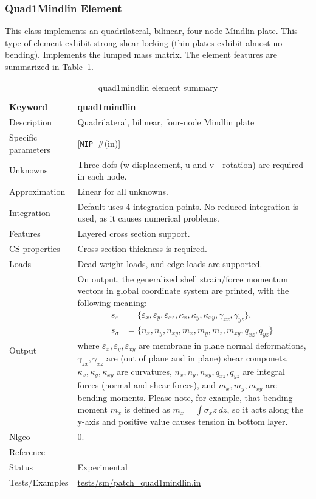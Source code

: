 \documentclass[a4paper]{article}
\newcommand{\param}[1]{\texttt{#1}} %
\newcommand{\optional}[1]{[#1]} %
\newcommand{\field}[2]{\param{#1}~\#{\tiny(#2)}} %
\newcommand{\optField}[2]{\optional{\field{#1}{#2}}}
\newcommand{\templabel}{}%
\newcommand{\tempcaption}{}%
\newcounter{nelpar}
\newenvironment{elementsummary}[5]{%
  \gdef\tempcaption{#4}%
  \gdef\templabel{#5}%
  \setcounter{nelpar}{0}%
  \begin{center} %
    \begin{table}[!htb] %
      \begin{tabular}{|l|p{9cm}|}\hline %
        {\bf Keyword} & \bf{#1}\\ %
        {Description} & {#2}\\ %
        {Specific parameters} & {#3}\\ \hline %
}{
  \\ \hline %
      \end{tabular}%
      \caption{\tempcaption}%
      \label{\templabel}%
    \end{table}%
  \end{center}%
}
\newcommand{\elementParam}[1]{%
  \ifthenelse{\value{nelpar}>0} %
             {&{#1}}%
             {\setcounter{nelpar}{1}Parameters&{#1}}%
             \\%
}
\newcommand{\elementDescription}[2]{{#1} & {#2}\\}
\begin{document}
\subsubsection{Quad1Mindlin Element} \label{quad1mindlin}
This class implements an quadrilateral, bilinear, four-node Mindlin plate.
This type of element exhibit strong shear locking (thin plates exhibit almost no bending).
Implements the lumped mass matrix. The element features are summarized in Table~\ref{quad1mindlinsummary}.

\begin{elementsummary}{quad1mindlin}{Quadrilateral, bilinear, four-node Mindlin plate}{\optField{NIP}{in}}{quad1mindlin element summary}{quad1mindlinsummary}
\elementDescription{Unknowns}{Three dofs (w-displacement, u and v - rotation) are required in each node.}
\elementDescription{Approximation}{Linear for all unknowns.}
\elementDescription{Integration}{Default uses 4 integration points. No reduced integration is used, as it causes numerical problems.}
\elementDescription{Features}{Layered cross section support.}
\elementDescription{CS properties}{Cross section thickness is required.}
\elementDescription{Loads}{Dead weight loads, and edge loads are supported.}
\elementDescription{Output}{On output, the generalized shell strain/force momentum vectors in global coordinate system are printed, with the following meaning:
\begin{align*}
s_{\varepsilon} &= \{\varepsilon_x, \varepsilon_y, \varepsilon_{xz}, \kappa_x, \kappa_y, \kappa_{xy}, \gamma_{xz}, \gamma_{yz}\},\\
s_{\sigma} &= \{n_x, n_y, n_{xy}, m_x, m_y, m_z, m_{xy}, q_{xz}, q_{yz}\}
\end{align*}
where $\varepsilon_x, \varepsilon_y, \varepsilon_{xy}$ are membrane in plane normal deformations, $\gamma_{zx}, \gamma_{xz}$ are (out of plane and in plane) shear componets, $\kappa_x, \kappa_y, \kappa_{xy}$ are curvatures, $n_x, n_y, n_{xy}, q_{xz}, q_{yz}$ are integral forces (normal and shear forces), and $m_x, m_y, m_{xy}$ are bending moments. 
Please note, for example, that bending moment $m_x$ is defined as $m_x=\int \sigma_x z\ dz$, so it acts along the y-axis and positive value causes tension in bottom layer.}
\elementDescription{Nlgeo}{0.}
\elementDescription{Reference}{\cite{RobertCook1989}}
\elementDescription{Status}{Experimental}
\elementDescription{Tests/Examples}{\href{https://github.com/oofem/oofem/blob/devel/tests/sm/patch\_quad1mindlin.in}{tests/sm/patch\_quad1mindlin.in}}
\end{elementsummary}
\end{document}
